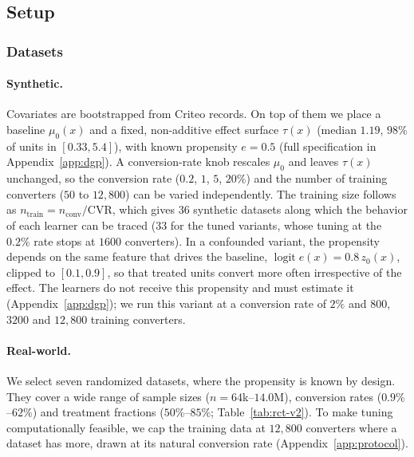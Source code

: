 \documentclass{article}
\begin{document}
\subsection{Setup}
\label{sec:setup-v2}

\subsubsection{Datasets}
\label{sec:datasets-v2}

\paragraph{Synthetic.}
Covariates are bootstrapped from Criteo records. On top of them we place a
baseline $\mu_0(x)$ and a fixed, non-additive effect surface
$\tau(x)$ (median $1.19$, $98\%$ of units in $[0.33, 5.4]$), with known propensity $e = 0.5$
(full specification in Appendix~\ref{app:dgp}). A conversion-rate knob
rescales $\mu_0$ and leaves $\tau(x)$ unchanged, so the conversion rate ($0.2$,
$1$, $5$, $20\%$) and the number of training converters ($50$ to $12{,}800$)
can be varied independently. The training size follows as
$n_{\text{train}} = n_{\text{conv}}/\mathrm{CVR}$, which gives $36$
synthetic datasets along which the behavior of each learner can be traced
($33$ for the tuned variants, whose tuning at the $0.2\%$ rate stops at
$1600$ converters). In a confounded variant, the propensity depends on the
same feature that drives the baseline, $\operatorname{logit} e(x) = 0.8\,
z_0(x)$, clipped to $[0.1, 0.9]$, so that treated units convert more often
irrespective of the effect. The learners do not receive this propensity and
must estimate it (Appendix~\ref{app:dgp}); we run this variant at a conversion rate of $2\%$ and
$800$, $3200$ and $12{,}800$ training converters.

\paragraph{Real-world.}
We select seven randomized datasets, where the propensity is known by design.
They cover a wide range of sample sizes ($n = 64$k--$14.0$M), conversion rates
($0.9\%$--$62\%$) and treatment fractions ($50\%$--$85\%$;
Table~\ref{tab:rct-v2}). To make tuning computationally feasible, we cap the training data at $12{,}800$ converters
where a dataset has more, drawn at its natural conversion rate
(Appendix~\ref{app:protocol}).
\end{document}
